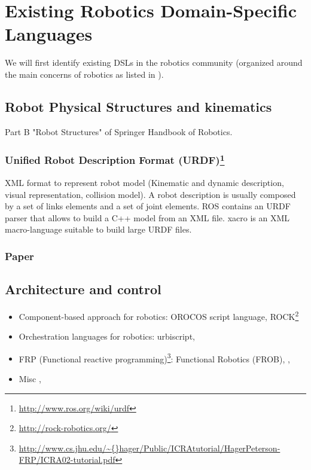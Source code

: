 \documentclass[doc]{apa}
\begin{document}
\section{Existing Robotics Domain-Specific Languages} %
\label{sec:Existing_Robotics_Domain-Specific_Languages}
We will first identify existing DSLs in the robotics community (organized around the main concerns of robotics as listed in \cite{SpringerHandbook:2008fk}).
\subsection{Robot Physical Structures and kinematics}
Part B "Robot Structures" of Springer Handbook of Robotics.

\subsubsection{Unified Robot Description Format (URDF)\footnote{\url{http://www.ros.org/wiki/urdf}}}
XML format to represent robot model (Kinematic and dynamic description, visual representation, collision model).
A robot description is usually composed by a set of links elements and a set of joint elements.
ROS contains an URDF parser that allows to build a C++ model from an XML file.
xacro is an XML macro-language suitable to build large URDF files.

\subsubsection{Paper\cite{Brugali:2007uq}}

\subsection{Architecture and control}
\begin{itemize}
\item Component-based approach for robotics: OROCOS script language, ROCK\footnote{\url{http://rock-robotics.org/}} \cite{Joyeux:2011fk}
\item Orchestration languages for robotics: urbiscript\cite{Baillie:2005},
\item FRP (Functional reactive programming)\footnote{\url{http://www.cs.jhu.edu/\~{}hager/Public/ICRAtutorial/HagerPeterson-FRP/ICRA02-tutorial.pdf}}: Functional Robotics (FROB)\cite{Hager:1999fk}, \cite{Peterson:1999lk}, \cite{Pembeci:2002fc}
\item Misc \cite{Thiry:2008ys}, \cite{Proetzsch:2010vn}
\end{itemize}
\end{document}

